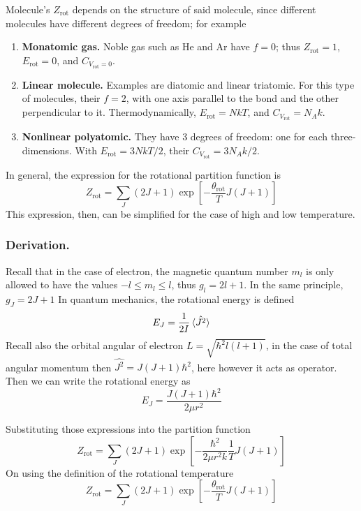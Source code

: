 \documentclass[../../../Main.tex]{subfiles}
\begin{document}
Molecule's $Z_\text{rot}$ depends on the structure of said molecule, since different molecules have different degrees of freedom; for example
\begin{enumerate}
	\item \textbf{Monatomic gas.} Noble gas such as He and Ar have $f=0$; thus $Z_\text{rot}=1$, $E_\text{rot}=0$, and $C_{V_\text{rot}=0}$.
	\item \textbf{Linear molecule.} Examples are diatomic and linear triatomic. For this type of molecules, their $f=2$, with one axis parallel to the bond and the other perpendicular to it. Thermodynamically, $E_\text{rot}=NkT$, and $C_{V_\text{rot}}=N_Ak$.
	\item \textbf{Nonlinear polyatomic.} They have 3 degrees of freedom: one for each three-dimensions. With $E_\text{rot}=3NkT/2$, their $C_{V_\text{rot}}=3N_Ak/2$.
\end{enumerate}

In general, the expression for the rotational partition function is
\begin{equation*}
	Z_\text{rot}=\sum_J(2J+1)\exp\left[-\frac{\theta_\text{rot}}{T}J(J+1)\right]
\end{equation*}
This expression, then, can be simplified for the case of high and low temperature.

\subsubsection*{Derivation.} Recall that in the case of electron, the magnetic quantum number $m_l$ is only allowed to have the values $-l\leq m_l\leq l$, thus $g_l=2l+1$. In the same principle, $g_J=2J+1$ In quantum mechanics, the rotational energy is defined
\begin{equation*}
	E_J=\frac{1}{2I}\braket{\hat{J^2}}
\end{equation*}
Recall also the orbital angular of electron $L=\sqrt{\hbar^2l(l+1)}$, in the case of total angular momentum then $\hat{J^2}= J(J+1)\hbar^2$, here however it acts as operator. Then we can write the rotational energy as
\begin{equation*}
	E_J=\frac{J(J+1)\hbar^2}{2\mu r^2 }
\end{equation*}

Substituting those expressions into the partition function
\begin{equation*}
	Z_\text{rot}=\sum_J(2J+1)\exp\left[-\frac{\hbar^2}{2\mu r^2 k}\frac{1}{T}J(J+1)\right]
\end{equation*}
On using the definition of the rotational temperature
\begin{equation*}
	Z_\text{rot}=\sum_J(2J+1)\exp\left[-\frac{\theta_\text{rot}}{T}J(J+1)\right]
\end{equation*}
\end{document}
